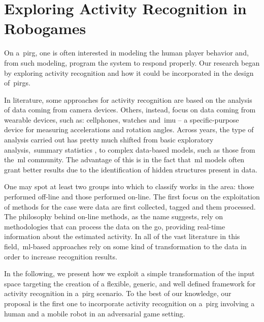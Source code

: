 \chapter{Exploring Activity Recognition in Robogames}\label{ch:activity}
On a~\gls{pirg}, one is often interested in modeling the human player behavior and, from such modeling, program the system to respond properly. Our research began by exploring activity recognition and how it could be incorporated in the design of~\gls{pirg}s. 

In literature, some approaches for activity recognition are based on the analysis of data coming from camera devices. Others, instead, focus on data coming from wearable devices, such as: cellphones, watches and~\gls{imu} -- a specific-purpose device for measuring accelerations and rotation angles. Across years, the type of analysis carried out has pretty much shifted from basic exploratory analysis,~\eg summary statistics %
, to complex data-based models, such as those from the~\gls{ml} community. The advantage of this is in the fact that~\gls{ml} models often grant better results due to the identification of hidden structures present in data.

One may spot at least two groups into which to classify works in the area: those performed off-line and those performed on-line. The first focus on the exploitation of methods for the case were data are first collected, tagged and them processed. The philosophy behind on-line methods, as the name suggests, rely on methodologies that can process the data on the go, providing real-time information about the estimated activity. In all of the vast literature in this field,~\gls{ml}-based approaches rely on some kind of transformation to the data in order to increase recognition results. %

In the following, we present how we exploit a simple transformation of the input space targeting the creation of a flexible, generic, and well defined framework for activity recognition in a~\gls{pirg} scenario. To the best of our knowledge, our proposal is the first one to incorporate activity recognition on a~\glsdesc{pirg} involving a human and a mobile robot in an adversarial game setting.

